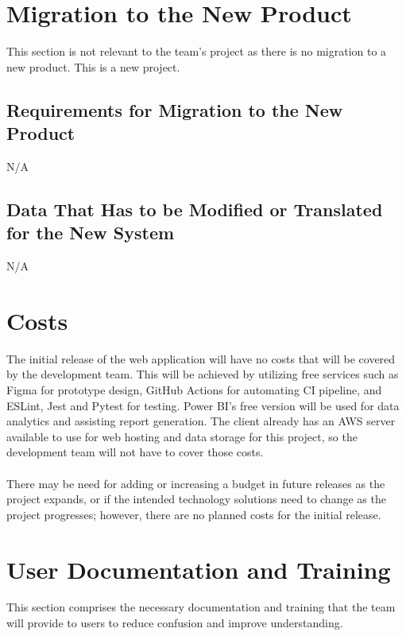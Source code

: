 \documentclass[12pt]{article}
\begin{document}
\newpage

\section{Migration to the New Product}
\hspace{2em}This section is not relevant to the team's project as there is no migration to a new product. This is a new project.
\subsection{Requirements for Migration to the New Product}
N/A
\subsection{Data That Has to be Modified or Translated for the New System}
N/A

\newpage

\section{Costs}
\hspace{2em}The initial release of the web application will have no costs that will be covered by the development team. 
This will be achieved by utilizing free services such as Figma for prototype design, GitHub Actions for automating CI pipeline, and ESLint, Jest and Pytest 
for testing. Power BI's free version will be used for data analytics and assisting report generation. The client already has an AWS 
server available to use for web hosting and data storage for this project, so the development team will not have to cover those costs.
\\\\
\indent There may be need for adding or increasing a budget in future releases as the project expands, or if the intended
technology solutions need to change as the project progresses; however, there are no planned costs for the initial release.

\newpage

\section{User Documentation and Training}
\hspace{2em}This section comprises the necessary documentation and training that the team will provide to users to reduce confusion and improve understanding.
\end{document}
